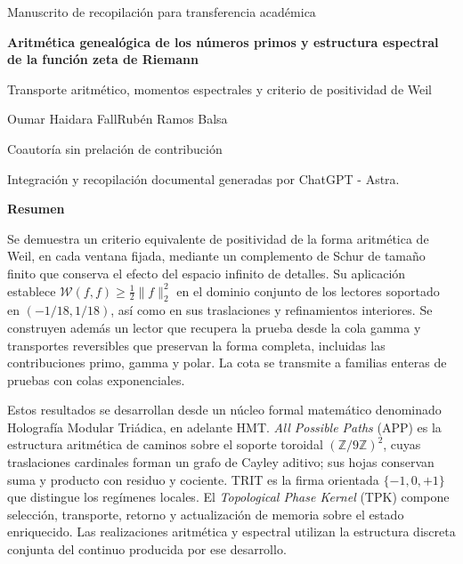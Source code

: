 \thispagestyle{empty}
\begin{center}
{\fontsize{10}{12}\selectfont Manuscrito de recopilación para transferencia académica\par}
\vspace{6mm}
{\fontsize{17}{20.5}\selectfont\bfseries Aritmética genealógica de los números primos y estructura espectral de la función zeta de Riemann\par}
\vspace{7pt}
{\fontsize{12}{14.5}\selectfont Transporte aritmético, momentos espectrales y criterio de positividad de Weil\par}
\vspace{8pt}
{\fontsize{11.5}{14}\selectfont Oumar Haidara Fall\space\textperiodcentered\space Rubén Ramos Balsa\par}
\vspace{4pt}
{\fontsize{8}{10}\selectfont Coautoría sin prelación de contribución\par}
\vspace{4pt}
{\fontsize{8}{10}\selectfont Integración y recopilación documental generadas por ChatGPT - Astra.\par}
\end{center}
\vspace{3pt}
{}
\begin{center}\bfseries Resumen\end{center}
\begingroup\fontsize{10.5}{12.8}\selectfont
Se demuestra un criterio equivalente de positividad de la forma aritmética de
Weil, en cada ventana fijada, mediante un complemento de Schur de tamaño
finito que conserva el efecto del espacio infinito de detalles.
Su aplicación establece
$\mathscr W(f,f)\geq\frac12\|f\|_2^2$ en el dominio conjunto
de los lectores soportado en $(-1/18,1/18)$, así como en sus
traslaciones y refinamientos interiores. Se construyen además un
lector que recupera la prueba desde la cola gamma y transportes
reversibles que preservan la forma completa, incluidas las
contribuciones primo, gamma y polar. La cota se transmite a familias
enteras de pruebas con colas exponenciales.

Estos resultados se desarrollan desde un núcleo formal matemático
denominado Holografía Modular Triádica, en adelante HMT.
\emph{All Possible Paths} (APP) es la estructura aritmética de
caminos sobre el soporte toroidal $(\mathbb Z/9\mathbb Z)^2$,
cuyas traslaciones cardinales forman un grafo de Cayley aditivo;
sus hojas conservan suma y producto con residuo y cociente. TRIT es
la firma orientada $\{-1,0,+1\}$ que distingue los regímenes
locales. El \emph{Topological Phase Kernel} (TPK) compone
selección, transporte, retorno y actualización de memoria sobre el
estado enriquecido. Las realizaciones aritmética y espectral
utilizan la estructura discreta conjunta del continuo producida
por ese desarrollo.

